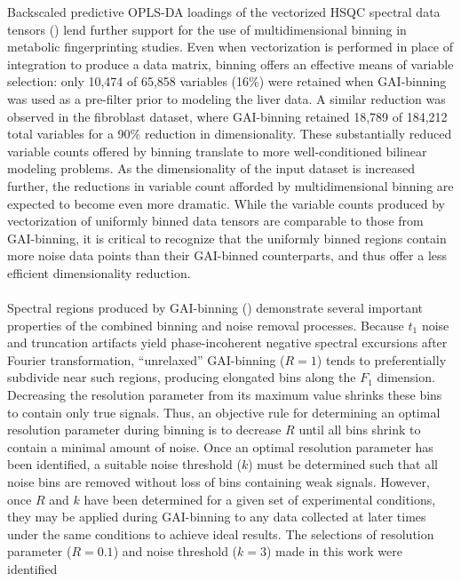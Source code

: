 \begin{doublespace}
Backscaled predictive OPLS-DA loadings of the vectorized \hcnmr{} HSQC spectral
data tensors () lend further support for the use of
multidimensional binning in metabolic fingerprinting studies. Even when
vectorization is performed in place of integration to produce a data matrix,
binning offers an effective means of variable selection: only 10,474 of 65,858
variables (16\%) were retained when GAI-binning was used as a pre-filter prior
to modeling the liver data. A similar reduction was observed in the fibroblast
dataset, where GAI-binning retained 18,789 of 184,212 total variables for
a 90\% reduction in dimensionality. These substantially reduced variable
counts offered by binning translate to more well-conditioned bilinear
modeling problems. As the dimensionality of the input dataset is
increased further, the reductions in variable count afforded by
multidimensional binning are expected to become even
more dramatic. While the variable counts produced by vectorization of uniformly
binned data tensors are comparable to those from GAI-binning, it is critical to
recognize that the uniformly binned regions contain more noise data points than
their GAI-binned counterparts, and thus offer a less efficient dimensionality
reduction.
\\\\
Spectral regions produced by GAI-binning ()
demonstrate several important properties of the combined binning and noise
removal processes. Because $t_1$ noise and truncation artifacts yield
phase-incoherent negative spectral excursions after Fourier
transformation, ``unrelaxed'' GAI-binning ($R = 1$) tends to
preferentially subdivide near such regions, producing
elongated bins along the $F_1$ dimension. Decreasing the resolution parameter
from its maximum value shrinks these bins to contain only true signals. Thus,
an objective rule for determining an optimal resolution parameter during
binning is to decrease $R$ until all bins shrink to contain a minimal amount
of noise. Once an optimal resolution parameter has been identified, a suitable
noise threshold ($k$) must be determined such that all noise bins are removed
without loss of bins containing weak signals. However, once $R$ and $k$ have
been determined for a given set of experimental conditions, they may be applied
during GAI-binning to any data collected at later times under the same
conditions to achieve ideal results. The selections of resolution parameter
($R = 0.1$) and noise threshold ($k = 3$) made in this work were identified

\end{doublespace}
